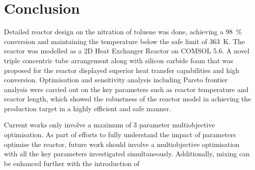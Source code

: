 \section{Conclusion} \label{sec:conclusion}
Detailed reactor design on the nitration of toluene was done, achieving a \SI{98}{\%} conversion and maintaining the temperature below the safe limit of \SI{363}{\K}. The reactor was modelled as a 2D Heat Exchanger Reactor on COMSOL 5.6. A novel triple concentric tube arrangement along with silicon carbide foam that was proposed for the reactor displayed superior heat transfer capabilities and high conversion. Optimisation and sensitivity analysis including Pareto frontier analysis were carried out on the key parameters such as reactor temperature and reactor length, which showed the robustness of the reactor model in achieving the production target in a highly efficient and safe manner. 

Current works only involve a maximum of 3 parameter multiobjective optimisation. As part of efforts to fully understand the impact of parameters optimise the reactor, future work should involve a multiobjective optimisation with all the key parameters investigated simultaneously. Additionally, mixing can be enhanced further with the introduction of 


